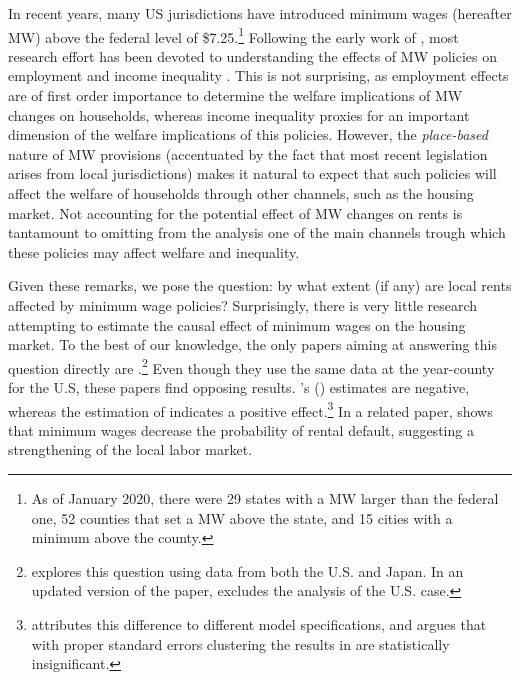 
In recent years, many US jurisdictions have introduced minimum wages (hereafter MW) above the 
federal level of \$7.25.\footnote{As of January 2020, there were 29 states with a MW larger 
	than the federal one, 52 counties that set a MW above the state, and 15 cities with a 
	minimum above the county.}
Following the early work of \textcite{CardKrueger2000}, most research effort has been devoted 
to understanding the effects of MW policies on employment \parencite[e.g.,][]{Neumark2006, 
DubeEtAl2010, MeerWest2016, CegnizEtAl2019} and income inequality \parencite{Lee1999, 
AutorEtAl2016}. This is not surprising, as employment effects are of first order importance 
to determine the welfare implications of MW changes on households, whereas income inequality 
proxies for an important dimension of the welfare implications of this policies. However, the 
\textit{place-based} nature of MW provisions (accentuated by the fact that most recent 
legislation arises from local jurisdictions) makes it natural to expect that such policies 
will affect the welfare of households through other channels, such as the housing market. 
Not accounting for the potential effect of MW changes on rents is tantamount to omitting 
from the analysis one of the main channels trough which these policies may affect welfare 
and inequality.

Given these remarks, we pose the question: by what extent (if any) are local rents affected 
by minimum wage policies? Surprisingly, there is very little research attempting to estimate 
the causal effect of minimum wages on the housing market. To the best of our knowledge, the 
only papers aiming at answering this question directly are \textcite{Yamagishi2019, 
Yamagishi2020, Tidemann2018}.\footnote{\textcite{Yamagishi2019} explores this question using 
data from both the U.S. and Japan. In an updated version of the paper, 
\textcite{Yamagishi2020} excludes the analysis of the U.S. case.} Even though they use the 
same data at the year-county for the U.S, these papers find opposing results. 
\citeauthor{Tidemann2018}'s (\citeyear{Tidemann2018}) estimates are negative, whereas the 
estimation of \textcite{Yamagishi2019} indicates a positive effect.\footnote{
	\textcite{Yamagishi2019} attributes this difference to different model 
	specifications, and argues that with proper standard errors clustering the results in 
	\textcite{Tidemann2018} are statistically insignificant.} 
In a related paper, \textcite{AgarwalEtAl2019} shows that minimum wages decrease 
the probability of rental default, suggesting a strengthening of the local labor market.

